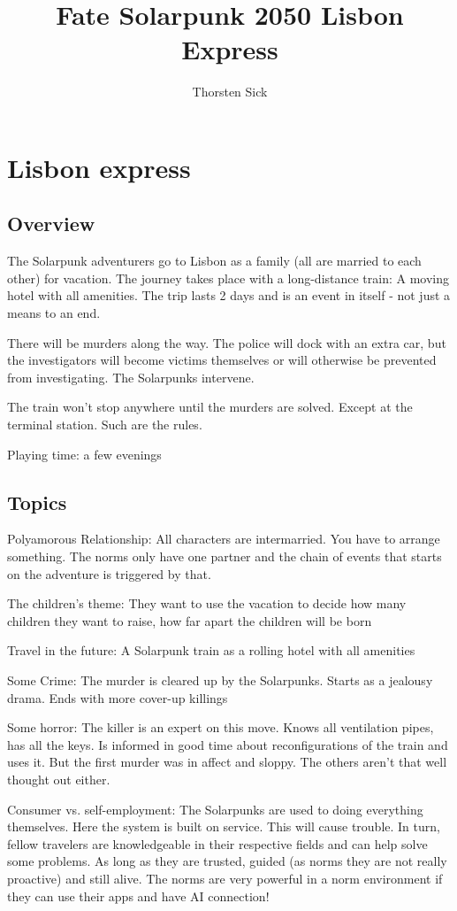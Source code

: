 \documentclass{book}
\title{Fate Solarpunk 2050 Lisbon Express}
\author{Thorsten Sick}
\begin{document}
\chapter{Lisbon express}

\section{Overview}

The Solarpunk adventurers go to Lisbon as a family (all are married to each other) for vacation. The journey takes place with a long-distance train: A moving hotel with all amenities. The trip lasts 2 days and is an event in itself - not just a means to an end.

There will be murders along the way. The police will dock with an extra car, but the investigators will become victims themselves or will otherwise be prevented from investigating. The Solarpunks intervene.

The train won't stop anywhere until the murders are solved. Except at the terminal station. Such are the rules.

Playing time: a few evenings

\section{Topics}

Polyamorous Relationship:
All characters are intermarried. You have to arrange something. The norms only have one partner and the chain of events that starts on the adventure is triggered by that.

The children's theme:
They want to use the vacation to decide how many children they want to raise, how far apart the children will be born

Travel in the future:
A Solarpunk train as a rolling hotel with all amenities

Some Crime:
The murder is cleared up by the Solarpunks. Starts as a jealousy drama. Ends with more cover-up killings

Some horror:
The killer is an expert on this move. Knows all ventilation pipes, has all the keys. Is informed in good time about reconfigurations of the train and uses it.
But the first murder was in affect and sloppy. The others aren't that well thought out either.

Consumer vs. self-employment:
The Solarpunks are used to doing everything themselves. Here the system is built on service. This will cause trouble. In turn, fellow travelers are knowledgeable in their respective fields and can help solve some problems. As long as they are trusted, guided (as norms they are not really proactive) and still alive.
The norms are very powerful in a norm environment if they can use their apps and have AI connection!
\end{document}
